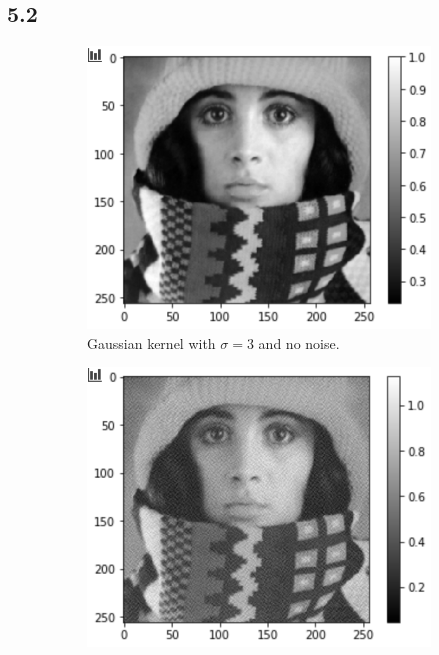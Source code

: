 \subsection*{5.2}
\begin{figure}[H]
	\centering
	\begin{subfigure}[b]{0.45\linewidth}
		\centering
		\includegraphics[width=\linewidth]{Materials/E5/dbn0}
		\caption{Gaussian kernel with $\sigma = 3$ and no noise.\\\hfill}
	\end{subfigure}
	\hfill
	\begin{subfigure}[b]{0.45\linewidth}
		\centering
		\includegraphics[width=\linewidth]{Materials/E5/dbn000000002}

\end{subfigure}
\end{figure}
